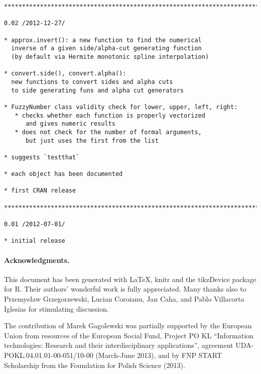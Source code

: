 \documentclass[11pt]{article}\usepackage{graphicx, color}
\makeatletter
\newenvironment{kframe}{%
 \def\at@end@of@kframe{}%
 \ifinner\ifhmode%
  \def\at@end@of@kframe{\end{minipage}}%
  \begin{minipage}{\columnwidth}%
 \fi\fi%
 \def\FrameCommand##1{\hskip\@totalleftmargin \hskip-\fboxsep
 \colorbox{shadecolor}{##1}\hskip-\fboxsep
     \hskip-\linewidth \hskip-\@totalleftmargin \hskip\columnwidth}%
 \MakeFramed {\advance\hsize-\width
   \@totalleftmargin\z@ \linewidth\hsize
   \@setminipage}}%
 {\par\unskip\endMakeFramed%
 \at@end@of@kframe}
\newenvironment{knitrout}{}{} %
\newcommand{\package}[1]{\textsf{#1}\xspace}
\newcommand{\lang}[1]{\textsf{#1}\xspace}
\newcommand{\R}{\lang{R}}
\makeatother
\begin{document}
\begin{knitrout}
\begin{kframe}
\begin{verbatim}
***************************************************************************

0.02 /2012-12-27/

* approx.invert(): a new function to find the numerical
  inverse of a given side/alpha-cut generating function
  (by default via Hermite monotonic spline interpolation)

* convert.side(), convert.alpha():
  new functions to convert sides and alpha cuts
  to side generating funs and alpha cut generators

* FuzzyNumber class validity check for lower, upper, left, right:
   * checks whether each function is properly vectorized
      and gives numeric results
   * does not check for the number of formal arguments,
      but just uses the first from the list

* suggests `testthat`

* each object has been documented

* first CRAN release

***************************************************************************

0.01 /2012-07-01/

* initial release
\end{verbatim}
\end{kframe}
\end{knitrout}



\paragraph{Acknowledgments.}
This document has been generated with \LaTeX, \package{knitr} and
the \package{tikzDevice} package for \R.
Their authors' wonderful work is fully appreciated.
Many thanks also to Przemys\l{}aw Grzegorzewski, Lucian Coroianu,
Jan Caha, and Pablo Villacorta Iglesias
for stimulating discussion.



The contribution of Marek Gagolewski was partially supported
by the European Union from resources of the European Social Fund, Project PO KL 
``Information technologies: Research and their interdisciplinary
applications'', agreement UDA-POKL.04.01.01-00-051/10-00 (March-June 2013),
and by FNP START Scholarship from the Foundation for Polish Science (2013).
\end{document}
